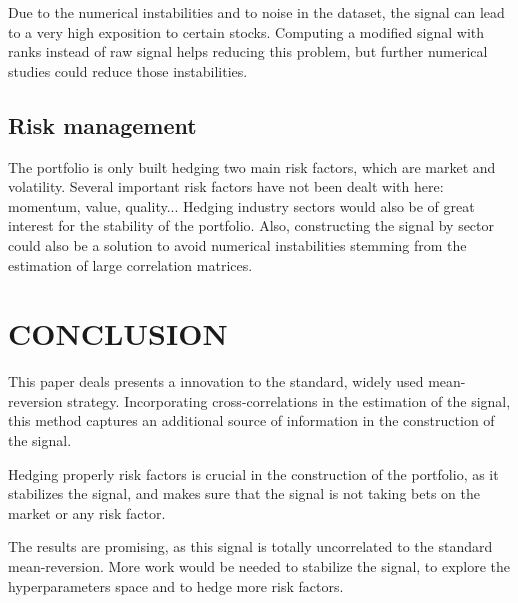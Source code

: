 \documentclass[letterpaper, 10 pt, conference]{ieeeconf}  %
\begin{document}
Due to the numerical instabilities and to noise in the dataset, the signal can lead to a very high exposition to certain stocks. Computing a modified signal with ranks instead of raw signal helps reducing this problem, but further numerical studies could reduce those instabilities. 

\subsection{Risk management}

The portfolio is only built hedging two main risk factors, which are market and volatility. Several important risk factors have not been dealt with here: momentum, value, quality... Hedging industry sectors would also be of great interest for the stability of the portfolio. Also, constructing the signal by sector could also be a solution to avoid numerical instabilities stemming from the estimation of large correlation matrices. 

\section{CONCLUSION}

This paper deals presents a innovation to the standard, widely used mean-reversion strategy. Incorporating cross-correlations in the estimation of the signal, this method captures an additional source of information in the construction of the signal.

Hedging properly risk factors is crucial in the construction of the portfolio, as it stabilizes the signal, and makes sure that the signal is not taking bets on the market or any risk factor.

The results are promising, as this signal is totally uncorrelated to the standard mean-reversion. More work would be needed to stabilize the signal, to explore the hyperparameters space and to hedge more risk factors.

\end{document}
